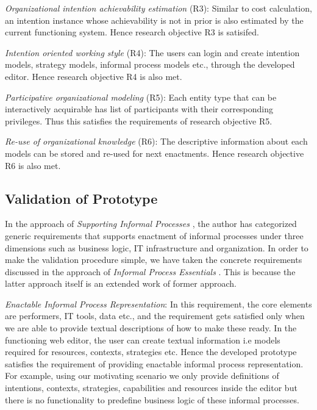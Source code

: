 \textit{Organizational intention achievability estimation} (R3): Similar to cost calculation, an intention instance whose achievability is not in prior is also estimated by the current functioning system. Hence research objective R3 is satisifed.

\textit{Intention oriented working style} (R4): The users can login and create intention models, strategy models, informal process models etc., through the developed editor. Hence research objective R4 is also met.

\textit{Participative organizational modeling} (R5): Each entity type that can be interactively acquirable has list of participants with their corresponding privileges. Thus this satisfies the requirements of research objective R5.

\textit{Re-use of organizational knowledge} (R6): The descriptive information about each models can be stored and re-used for next enactments. Hence research objective R6 is also met.
	
\subsection{Validation of Prototype}
\label{subsec:validationofprototype}
In the approach of \textit{Supporting Informal Processes} \cite{Sungur2014}, the author has categorized generic requirements that supports enactment of informal processes under three dimensions such as business logic, IT infrastructure and organization. In order to make the validation procedure simple, we have taken the concrete requirements discussed in the approach of \textit{Informal Process Essentials} \cite{Sungur2014a}. This is because the latter approach itself is an extended work of former approach.  

\textit{Enactable Informal Process Representation}: In this requirement, the core elements are performers, IT tools, data etc., and the requirement gets satisfied only when we are able to provide textual descriptions of how to make these ready. In the functioning web editor, the user can create textual information i.e models required for resources, contexts, strategies etc. Hence the developed prototype satisfies the requirement of providing enactable informal process representation. For example, using our motivating scenario we only provide definitions of intentions, contexts, strategies, capabilities and resources inside the editor but there is no functionality to  predefine business logic of these informal processes.

